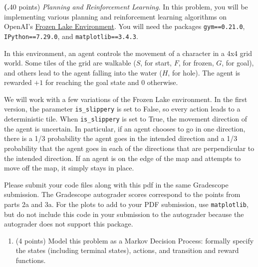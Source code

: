 \documentclass[12pt]{amsart}
\newenvironment{statement}[1]{\smallskip\noindent\color[rgb]{0.0,0.0,0.0} {\bf #1.}}{}
\theoremstyle{definition}
\theoremstyle{remark}
\newcommand{\1}{\mathds{1}}
\begin{document}
\newpage

\begin{statement}{4}
(40 points)
\emph{Planning and Reinforcement Learning. } In this problem, you will be implementing various planning and reinforcement learning algorithms on OpenAI's \href{https://gym.openai.com/envs/FrozenLake-v0/}{Frozen Lake Environment}. 
You will need the packages \texttt{gym==0.21.0}, \texttt{IPython==7.29.0}, and 
\texttt{matplotlib==3.4.3}.

In this environment, an agent controls the movement of a character in a 4x4 grid world. Some tiles of the grid are walkable ($S$, for start, $F$, for frozen, $G$, for goal), and others lead to the agent falling into the water ($H$, for hole). The agent is rewarded $+1$ for reaching the goal state and $0$ otherwise. 

We will work with a few variations of the Frozen Lake environment. In the first version, the parameter \verb|is_slippery| is set to False, so every action leads to a deterministic tile. When \verb|is_slippery| is set to True, the movement direction of the agent is uncertain. In particular, if an agent chooses to go in one direction, there is a 1/3 probability the agent goes in the intended direction and a 1/3 probability that the agent goes in each of the directions that are perpendicular to the intended direction. If an agent is on the edge of the map and attempts to move off the map, it simply stays in place.

\noindent
Please submit your code files along with this pdf in the same Gradescope submission. The Gradescope autograder scores correspond to the points from parts 2a and 3a.
For the plots to add to your PDF submission, use \texttt{matplotlib}, but do not include this code in your submission to the autograder because the autograder does not support this package.

\begin{enumerate}
    \item (4 points) Model this problem as a Markov Decision Process: formally specify the states (including terminal states), actions, and transition and reward functions.
    

\end{enumerate}
\end{statement}
\end{document}
